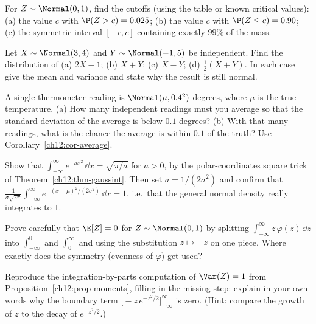 \begin{exercise}
\label{ch12:exr-inverse}
For $Z \sim \Normal(0,1)$, find the cutoffs (using the table or known critical
values): (a) the value $c$ with $\P(Z > c) = 0.025$; (b) the value $c$ with
$\P(Z \le c) = 0.90$; (c) the symmetric interval $[-c, c]$ containing exactly
$99\%$ of the mass.
\end{exercise}

\begin{exercise}
\label{ch12:exr-sum}
Let $X \sim \Normal(3, 4)$ and $Y \sim \Normal(-1, 5)$ be independent.
Find the distribution of (a) $2X - 1$; (b) $X + Y$; (c) $X - Y$;
(d) $\tfrac{1}{2}(X + Y)$. In each case give the mean and variance and state why
the result is still normal.
\end{exercise}

\begin{exercise}
\label{ch12:exr-average}
A single thermometer reading is $\Normal(\mu, 0.4^2)$ degrees, where $\mu$ is the
true temperature. (a) How many independent readings must you average so that the
standard deviation of the average is below $0.1$ degrees? (b) With that many
readings, what is the chance the average is within $0.1$ of the truth? Use
Corollary~\ref{ch12:cor-average}.
\end{exercise}

\begin{exercise}
\label{ch12:exr-gaussint}
Show that $\int_{-\infty}^{\infty} e^{-a x^2}\,\dd x = \sqrt{\pi/a}$ for $a > 0$,
by the polar-coordinates square trick of Theorem~\ref{ch12:thm-gaussint}. Then set
$a = 1/(2\sigma^2)$ and confirm that $\frac{1}{\sigma\sqrt{2\pi}}\int_{-\infty}^{\infty}
e^{-(x-\mu)^2/(2\sigma^2)}\,\dd x = 1$, i.e.\ that the general normal density really
integrates to $1$.
\end{exercise}

\begin{exercise}
\label{ch12:exr-mean}
Prove carefully that $\E[Z] = 0$ for $Z \sim \Normal(0,1)$ by splitting
$\int_{-\infty}^{\infty} z\,\varphi(z)\,\dd z$ into $\int_{-\infty}^{0}$ and
$\int_{0}^{\infty}$ and using the substitution $z \mapsto -z$ on one piece. Where
exactly does the symmetry (evenness of $\varphi$) get used?
\end{exercise}

\begin{exercise}
\label{ch12:exr-var}
Reproduce the integration-by-parts computation of $\Var(Z) = 1$ from
Proposition~\ref{ch12:prop-moments}, filling in the missing step: explain in your
own words why the boundary term $\big[-z\,e^{-z^2/2}\big]_{-\infty}^{\infty}$ is
zero. (Hint: compare the growth of $z$ to the decay of $e^{-z^2/2}$.)
\end{exercise}


